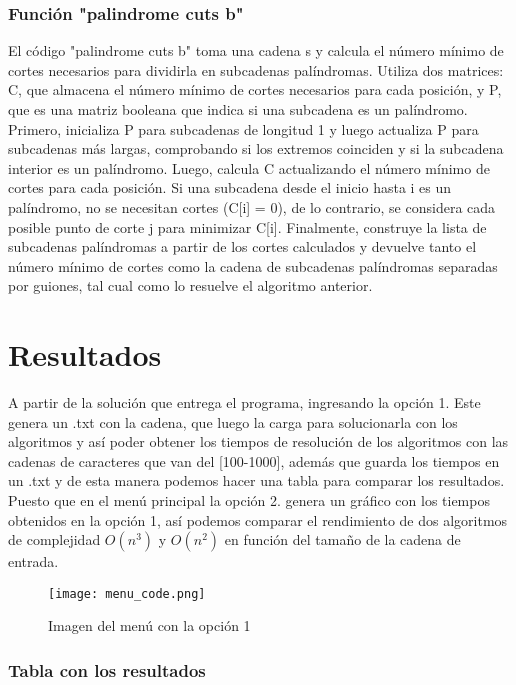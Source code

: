 \documentclass{report}
\begin{document}
\subsubsection{Función "palindrome cuts b"}
El código "palindrome cuts b" toma una cadena s y calcula el número mínimo de cortes necesarios para dividirla en subcadenas palíndromas. Utiliza dos matrices: C, que almacena el número mínimo de cortes necesarios para cada posición, y P, que es una matriz booleana que indica si una subcadena es un palíndromo. Primero, inicializa P para subcadenas de longitud 1 y luego actualiza P para subcadenas más largas, comprobando si los extremos coinciden y si la subcadena interior es un palíndromo. Luego, calcula C actualizando el número mínimo de cortes para cada posición. Si una subcadena desde el inicio hasta i es un palíndromo, no se necesitan cortes (C[i] = 0), de lo contrario, se considera cada posible punto de corte j para minimizar C[i]. Finalmente, construye la lista de subcadenas palíndromas a partir de los cortes calculados y devuelve tanto el número mínimo de cortes como la cadena de subcadenas palíndromas separadas por guiones, tal cual como lo resuelve el algoritmo anterior.
\newpage

\section{Resultados}
A partir de la solución que entrega el programa, ingresando la opción 1. Este genera un .txt con la cadena, que luego la carga para solucionarla con los algoritmos y así poder obtener los tiempos de resolución de los algoritmos con las cadenas de caracteres que van del [100-1000], además que guarda los tiempos en un .txt y de esta manera podemos hacer una tabla para comparar los resultados. Puesto que en el menú principal la opción 2. genera un gráfico con los tiempos obtenidos en la opción 1, así podemos comparar el rendimiento de dos algoritmos de complejidad \(O(n^3)\) y \(O(n^2)\) en función del tamaño de la cadena de entrada.

\begin{figure}[htb]
\centering
\texttt{[image: menu\_code.png]}
\caption{Imagen del menú con la opción 1}
\label{fig:tigre}
\end{figure}

\subsubsection{Tabla con los resultados}
\end{document}
